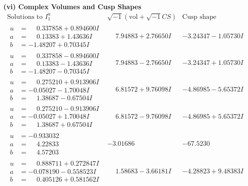 \documentclass[1p]{elsarticle_modified}
\theoremstyle{definition}
\newcommand{\I}{\sqrt{-1}}
\begin{document}
\newpage\flushleft \textbf{(vi) Complex Volumes and Cusp Shapes}
$$\begin{array}{c|c|c}  
\text{Solutions to }I^u_{1}& \I (\text{vol} + \sqrt{-1}CS) & \text{Cusp shape}\\
 \hline 
\begin{aligned}
u &= \phantom{-}0.337858 + 0.894600 I \\
a &= \phantom{-}0.13383 + 1.43636 I \\
b &= -1.48207 + 0.70345 I\end{aligned}
 & \phantom{-}7.94883 + 2.76650 I & -3.24347 - 1.05730 I \\ \hline\begin{aligned}
u &= \phantom{-}0.337858 - 0.894600 I \\
a &= \phantom{-}0.13383 - 1.43636 I \\
b &= -1.48207 - 0.70345 I\end{aligned}
 & \phantom{-}7.94883 - 2.76650 I & -3.24347 + 1.05730 I \\ \hline\begin{aligned}
u &= \phantom{-}0.275210 + 0.913906 I \\
a &= -0.05027 - 1.70048 I \\
b &= \phantom{-}1.38687 - 0.67504 I\end{aligned}
 & \phantom{-}6.81572 + 9.76098 I & -4.86985 - 5.65372 I \\ \hline\begin{aligned}
u &= \phantom{-}0.275210 - 0.913906 I \\
a &= -0.05027 + 1.70048 I \\
b &= \phantom{-}1.38687 + 0.67504 I\end{aligned}
 & \phantom{-}6.81572 - 9.76098 I & -4.86985 + 5.65372 I \\ \hline\begin{aligned}
u &= -0.933032\phantom{ +0.000000I} \\
a &= \phantom{-}4.22833\phantom{ +0.000000I} \\
b &= \phantom{-}4.57203\phantom{ +0.000000I}\end{aligned}
 & -3.01686\phantom{ +0.000000I} & -67.5230\phantom{ +0.000000I} \\ \hline\begin{aligned}
u &= \phantom{-}0.888711 + 0.272847 I \\
a &= -0.078190 - 0.558523 I \\
b &= \phantom{-}0.405126 + 0.581562 I\end{aligned}
 & \phantom{-}1.58683 - 3.66181 I & -4.28823 + 9.48383 I \\ \hline\begin{aligned}

\end{aligned}
\end{array}$$
\end{document}
